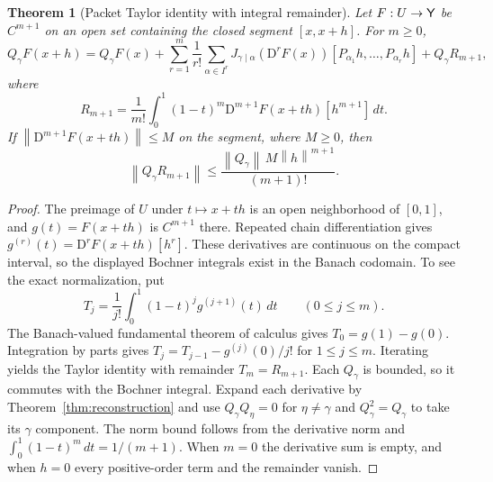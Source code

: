 \documentclass[11pt]{article}
\newtheorem{theorem}{Theorem}[section]
\theoremstyle{remark}\newtheorem{remark}[theorem]{Remark}
\newcommand{\norm}[1]{\left\lVert#1\right\rVert}
\newcommand{\D}{\mathrm D}
\begin{document}
\begin{theorem}[Packet Taylor identity with integral remainder]\label{thm:taylor}
Let $F:U\to\mathsf Y$ be $C^{m+1}$ on an open set containing the closed segment $[x,x+h]$. For $m\ge0$,
\[
Q_\gamma F(x+h)=Q_\gamma F(x)
+\sum_{r=1}^{m}\frac{1}{r!}\sum_{\alpha\in I^r}
J_{\gamma\mid\alpha}(\D^rF(x))
[P_{\alpha_1}h,\ldots,P_{\alpha_r}h]
+Q_\gamma R_{m+1},
\]
where
\[
R_{m+1}=\frac1{m!}\int_0^1(1-t)^m\D^{m+1}F(x+th)[h^{m+1}]\,dt.
\]
If $\norm{\D^{m+1}F(x+th)}\le M$ on the segment, where $M\ge0$, then
\[
\norm{Q_\gamma R_{m+1}}\le\frac{\norm{Q_\gamma}\,M\norm{h}^{m+1}}{(m+1)!}.
\]
\end{theorem}
\begin{proof}
The preimage of $U$ under $t\mapsto x+th$ is an open neighborhood of $[0,1]$, and $g(t)=F(x+th)$ is $C^{m+1}$ there. Repeated chain differentiation gives $g^{(r)}(t)=\D^rF(x+th)[h^r]$. These derivatives are continuous on the compact interval, so the displayed Bochner integrals exist in the Banach codomain. To see the exact normalization, put
\[
T_j=\frac1{j!}\int_0^1(1-t)^j g^{(j+1)}(t)\,dt
\qquad(0\le j\le m).
\]
The Banach-valued fundamental theorem of calculus gives $T_0=g(1)-g(0)$. Integration by parts gives
$T_j=T_{j-1}-g^{(j)}(0)/j!$ for $1\le j\le m$. Iterating yields the Taylor identity with remainder $T_m=R_{m+1}$. Each $Q_\gamma$ is bounded, so it commutes with the Bochner integral. Expand each derivative by Theorem~\ref{thm:reconstruction} and use $Q_\gamma Q_\eta=0$ for $\eta\ne\gamma$ and $Q_\gamma^2=Q_\gamma$ to take its $\gamma$ component. The norm bound follows from the derivative norm and $\int_0^1(1-t)^m\,dt=1/(m+1)$. When $m=0$ the derivative sum is empty, and when $h=0$ every positive-order term and the remainder vanish.
\end{proof}

\end{document}

